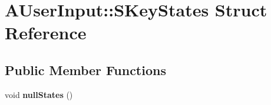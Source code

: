 \hypertarget{structAUserInput_1_1SKeyStates}{\section{A\-User\-Input\-:\-:S\-Key\-States Struct Reference}
\label{structAUserInput_1_1SKeyStates}
}
\subsection*{Public Member Functions}
\begin{DoxyCompactItemize}
\item 
\hypertarget{structAUserInput_1_1SKeyStates_a15f162c6a5b63e222fc463e0ac561798}{void {\bfseries null\-States} ()}\label{structAUserInput_1_1SKeyStates_a15f162c6a5b63e222fc463e0ac561798}

\end{DoxyCompactItemize}
